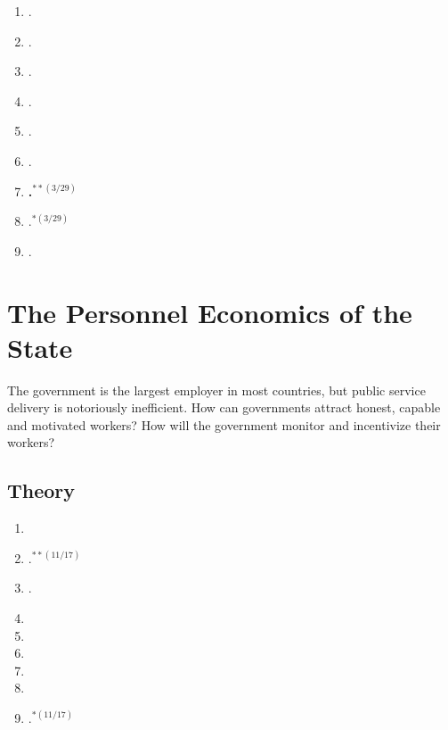 \documentclass[11pt]{article}
\begin{document}
\begin{enumerate}
\item {}.
\item {}.
\item {}.
\item {}.
\item {}.
\item {}.
\item \textbf{.$^{**(3/29)}$}
\item {}.$^{*(3/29)}$
\item {}.
\end{enumerate}

\section{The Personnel Economics of the State}
The government is the largest employer in most countries, but public service delivery is notoriously inefficient. How can governments attract honest, capable and motivated workers? How will the government monitor and incentivize their workers?


\subsection{Theory}

\begin{enumerate}
\item {}
\item \textbf{}.$^{**(11/17)}$
\item {}.
\item {}
\item {}
\item {}
\item {}
\item {}
\item {}.$^{*(11/17)}$
\end{enumerate}
\end{document}
